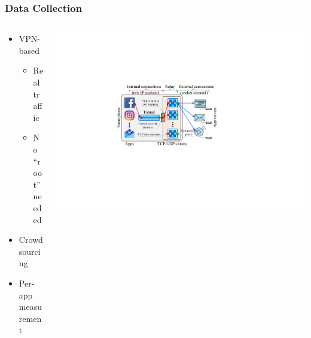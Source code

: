 \begin{frame}
    \frametitle{Data Collection}

    \begin{columns}
        \begin{column}{.4\textwidth}
            \begin{itemize}
                \item VPN-based
                \begin{itemize}
                    \item Real traffic
                    \item No ``root'' needed
                \end{itemize}
                \item Crowdsourcing
                \item Per-app measurement
            \end{itemize}
        \end{column}

        \begin{column}{.6\textwidth}
            \includegraphics[width=\textwidth]{fig/mopeye.pdf}
        \end{column}
    \end{columns}
\end{frame}

